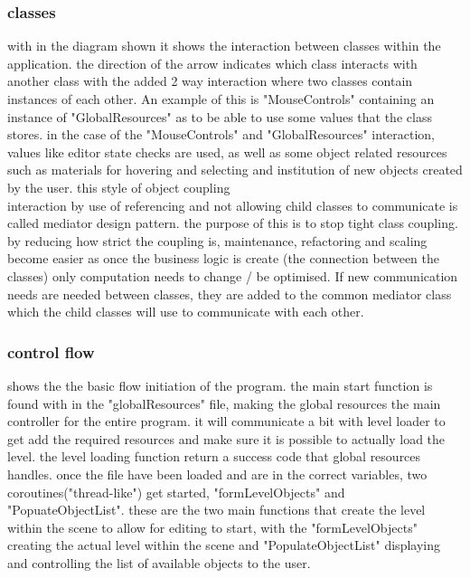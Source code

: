 \subsubsection{classes}
with in the diagram shown  it shows the interaction between classes within the application. the direction of the arrow indicates which class interacts with another class with the added 2 way interaction where two classes contain instances of each other. An example of this is "MouseControls" containing an instance of "GlobalResources" as to be able to use some values that the class stores. in the case of the "MouseControls" and "GlobalResources" interaction, values like editor state checks are used, as well as some object related resources such as materials for hovering and selecting and institution of new objects created by the user.
this style of object coupling \\ interaction by use of referencing and not allowing child classes to communicate is called mediator design pattern. the purpose of this is to stop tight class coupling. by reducing how strict the coupling is, maintenance, refactoring and scaling become easier as once the business logic is create (the connection between the classes) only computation needs to change / be optimised. If new communication needs are needed between classes, they are added to the common mediator class which the child classes will use to communicate with each other. 
\subsubsection{control flow}
 shows the the basic flow initiation of the program. the main start function is found with in the "globalResources" file, making the global resources the main controller for the entire program. it will communicate a bit with level loader to get add the required resources and make sure it is possible to actually load the level. the level loading function return a success code that global resources handles. 
once the file have been loaded and are in the correct variables, two coroutines("thread-like") get started, "formLevelObjects" and "PopuateObjectList". these are the two main functions that create the level within the scene to allow for editing to start, with the "formLevelObjects" creating the actual level within the scene and "PopulateObjectList" displaying and controlling the list of available objects to the user.

